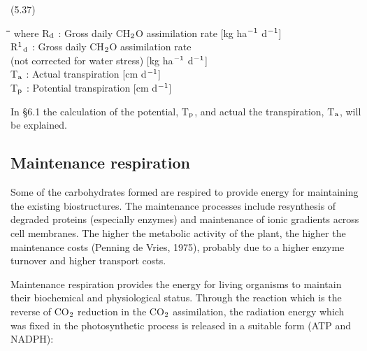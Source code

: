  
\strut\hfill (5.37)

\nwln
\begin{tabbing}
\hspace{1.27cm}\=\hspace{1.27cm}\=\hspace{1.27cm}\=\hspace{1.27cm}\=%
\hspace{1.27cm}\=\hspace{1.27cm}\=\hspace{1.27cm}\=\hspace{1.27cm}\=%
\hspace{1.27cm}\=\hspace{1.27cm}\=\kill
where R$_{{\rm d}}$ : Gross daily CH$_{{\rm 2}}$O assimilation rate        [kg ha$^{{\rm -1}}$ d$^{{\rm -1}}$]\\
R$^{{\rm 1}}$$_{{\rm d}}$ : Gross daily CH$_{{\rm 2}}$O assimilation rate\\
   (not corrected for water stress)        [kg ha$^{{\rm -1}}$ d$^{{\rm -1}}$]\\
T$_{{\rm a}}$ : Actual transpiration        [cm d$^{{\rm -1}}$]\\
T$_{{\rm p}}$ : Potential transpiration        [cm d$^{{\rm -1}}$]
\end{tabbing}

 
In \S 6.1 the calculation of the potential, T$_{{\rm p}}$, and actual the transpiration, T$_{{\rm a}}$, will be ex\-plained.




\subsection{Maintenance respiration  }

Some of the carbohydrates formed are respired to provide energy for maintaining the
existing biostructures. The maintenance processes include resynthesis of degraded proteins
(especially enzymes) and maintenance of ionic gradients across cell mem\-branes. The
higher the metabolic activity of the plant, the higher the mainte\-nance costs (Penning de
Vries, 1975), probably due to a higher enzyme turnover and higher transport costs.

Maintenance respiration provides the energy for living organisms to maintain their
biochemical and physiological status. Through the reaction which is the reverse of CO$_{{\rm 2}}$
reduction in the CO$_{{\rm 2}}$ assimila\-tion, the radiation energy which was fixed in the photosyn\-thetic process is released in a suitable form (ATP and NADPH):

